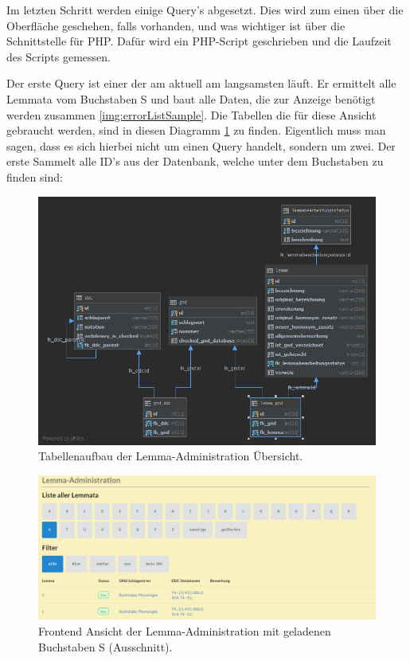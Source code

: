 Im letzten Schritt werden einige Query’s abgesetzt. Dies wird zum einen über die Oberfläche geschehen, falls vorhanden, und was wichtiger ist über die Schnittstelle für PHP. Dafür wird ein PHP-Script geschrieben und die Laufzeit des Scripts gemessen.

Der erste Query ist einer der am aktuell am langsamsten läuft. Er ermittelt alle Lemmata vom Buchstaben S und baut alle Daten, die zur Anzeige benötigt werden zusammen \ref{img:errorListSample}. Die Tabellen die für diese Ansicht gebraucht werden, sind in diesen Diagramm \ref{img:lAdminStructure} zu finden. Eigentlich muss man sagen, dass es sich hierbei nicht um einen Query handelt, sondern um zwei. Der erste Sammelt alle ID’s aus der Datenbank, welche unter dem Buchstaben zu finden sind:

\begin{figure}
	\centering
	\includegraphics[width=0.8\linewidth]{images/structure_lemmaadministration.png}
	\caption{Tabellenaufbau der Lemma-Administration Übersicht.}
	\label{img:lAdminStructure}
\end{figure}

\begin{figure}
	\centering
	\includegraphics[width=1\linewidth]{images/lemmaadministration_sample.PNG}
	\caption{Frontend Ansicht der Lemma-Administration mit geladenen Buchstaben S (Ausschnitt).}
	\label{img:lAdminSample}
\end{figure}


